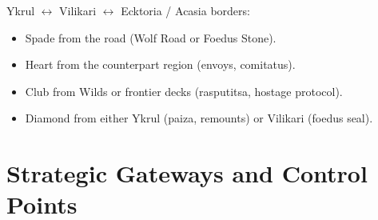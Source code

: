 Ykrul $\leftrightarrow$ Vilikari $\leftrightarrow$ Ecktoria / Acasia borders:

\begin{itemize}
    \item Spade from the road (Wolf Road or Foedus Stone).
    \item Heart from the counterpart region (envoys, comitatus).
    \item Club from Wilds or frontier decks (rasputitsa, hostage protocol).
    \item Diamond from either Ykrul (paiza, remounts) or Vilikari (foedus seal).
\end{itemize}

\section{Strategic Gateways and Control Points}\label{sec:gateways}

